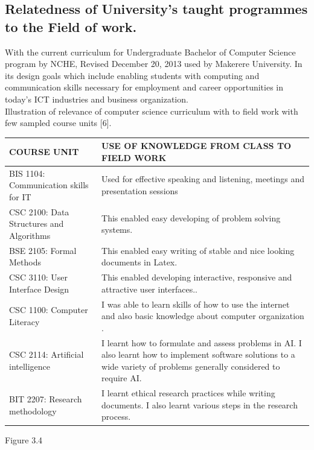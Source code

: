 \documentclass[11pt]{article}
\begin{document}
\subsection{Relatedness of University’s taught programmes to the Field of work.}
With the current curriculum for Undergraduate Bachelor of Computer Science program by NCHE,
Revised December 20, 2013 used by Makerere University. In its design goals which include
enabling students with computing and communication skills necessary for employment and career
opportunities in today’s ICT industries and business organization.\\

Illustration of relevance of computer science curriculum with to field work with few sampled
course units [6].\\

\begin{center}
	\begin{tabular}{ | m{20em} | m{20em}|  } 
		\hline
		COURSE UNIT & USE OF KNOWLEDGE FROM CLASS TO FIELD
		WORK  \\ 
		\hline
		BIS 1104: Communication skills for IT & Used for effective speaking and listening, meetings and
		presentation sessions  \\ 
		\hline
		CSC 2100: Data Structures and
		Algorithms & This enabled easy developing of problem solving
		systems.  \\ 
		\hline
		BSE 2105: Formal Methods & This enabled easy writing of stable and nice looking documents in Latex.  \\ 
		\hline
		CSC 3110: User Interface Design & This enabled developing interactive, responsive and attractive user interfaces..  \\ 
		\hline
		CSC 1100: Computer Literacy & I was able to learn skills of how to use the internet and also basic knowledge about computer organization .  \\ 
		\hline
		CSC 2114: Artificial intelligence & I learnt how to formulate and assess problems in AI. I also learnt how to implement software solutions to a wide variety of problems generally considered to require AI.  \\ 
		\hline
		BIT 2207: Research methodology & I learnt ethical research practices while writing documents. I also learnt various steps in the research process.  \\ 
		\hline
	\end{tabular}

Figure 3.4\\
\end{center}
\end{document}
